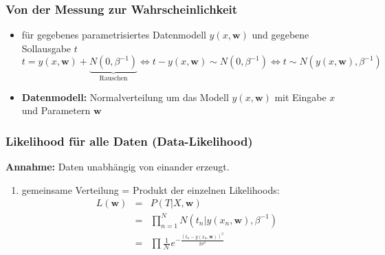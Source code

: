 	\subsubsection{Von der Messung zur Wahrscheinlichkeit}
	\begin{itemize}
		\item für gegebenes parametrisiertes Datenmodell $y(x, \pmb{w})$ und gegebene Sollausgabe $t$
		\begin{equation*}
			t = y(x, \pmb{w}) + \underbrace{N(0, \beta^{-1})}_\text{Rauschen}
			\Leftrightarrow t - y(x, \pmb{w}) \sim N(0, \beta^{-1})
			\Leftrightarrow t \sim N(y(x, \pmb{w}), \beta^{-1})
		\end{equation*}
		\item \textbf{Datenmodell:} Normalverteilung um das Modell $y(x, \pmb{w})$ mit Eingabe $x$ und Parametern $\pmb{w}$
	\end{itemize}
	\subsubsection{Likelihood für alle Daten (Data-Likelihood)}
	\textbf{Annahme:} Daten unabhängig von einander erzeugt.\vspace*{-5pt}
	\begin{enumerate}[$\hookrightarrow$]
		\item gemeinsame Verteilung = Produkt der einzelnen Likelihoods:
		\begin{eqnarray*}
			L(\pmb{w}) &=& P(T\vert X, \pmb{w})\\
			&=& \prod_{n=1}^N N(t_n\vert y(x_n, \pmb{w}), \beta^{-1})\\
			&=& \prod \frac{1}{\mathcal{N}}e^{-\frac{(t_n-y(x_n, \pmb{w}))^2}{2\sigma^2}}
		\end{eqnarray*}
	\end{enumerate}
